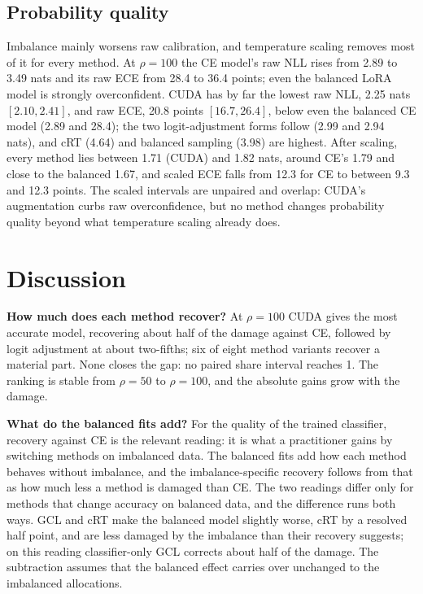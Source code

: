\subsection{Probability quality}
Imbalance mainly worsens raw calibration, and temperature scaling removes most of it for every method. At $\rho=100$ the CE model's raw NLL rises from 2.89 to 3.49 nats and its raw ECE from 28.4 to 36.4 points; even the balanced LoRA model is strongly overconfident. CUDA has by far the lowest raw NLL, 2.25 nats $[2.10, 2.41]$, and raw ECE, 20.8 points $[16.7, 26.4]$, below even the balanced CE model (2.89 and 28.4); the two logit-adjustment forms follow (2.99 and 2.94 nats), and cRT (4.64) and balanced sampling (3.98) are highest. After scaling, every method lies between 1.71 (CUDA) and 1.82 nats, around CE's 1.79 and close to the balanced 1.67, and scaled ECE falls from 12.3 for CE to between 9.3 and 12.3 points. The scaled intervals are unpaired and overlap: CUDA's augmentation curbs raw overconfidence, but no method changes probability quality beyond what temperature scaling already does.

\section{Discussion}
\label{sec:discussion}
\textbf{How much does each method recover?} At $\rho=100$ CUDA gives the most accurate model, recovering about half of the damage against CE, followed by logit adjustment at about two-fifths; six of eight method variants recover a material part. None closes the gap: no paired share interval reaches 1. The ranking is stable from $\rho=50$ to $\rho=100$, and the absolute gains grow with the damage.

\textbf{What do the balanced fits add?} For the quality of the trained classifier, recovery against CE is the relevant reading: it is what a practitioner gains by switching methods on imbalanced data. The balanced fits add how each method behaves without imbalance, and the imbalance-specific recovery follows from that as how much less a method is damaged than CE. The two readings differ only for methods that change accuracy on balanced data, and the difference runs both ways. GCL and cRT make the balanced model slightly worse, cRT by a resolved half point, and are less damaged by the imbalance than their recovery suggests; on this reading classifier-only GCL corrects about half of the damage. The subtraction assumes that the balanced effect carries over unchanged to the imbalanced allocations.

